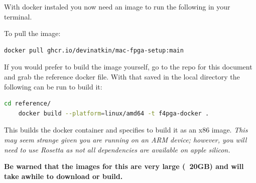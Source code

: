 With docker instaled you now need an image to run the following in your terminal.

To pull the image:
\begin{lstlisting}[language=bash]
    docker pull ghcr.io/devinatkin/mac-fpga-setup:main
\end{lstlisting}

If you would prefer to build the image yourself, go to the repo for this document and grab the reference docker file. 
With that saved in the local directory the following can be run to build it:

\begin{lstlisting}[language=bash]
    cd reference/
    docker build --platform=linux/amd64 -t f4pga-docker .
\end{lstlisting}

This builds the docker container and specifies to build it as an x86 image. 
\textit{This may seem strange given you are running on an ARM device; however, you will need to use Rosetta as not all dependencies are available on apple silicon.}


\textbf{Be warned that the images for this are very large (~20GB) and will take awhile to download or build.}
